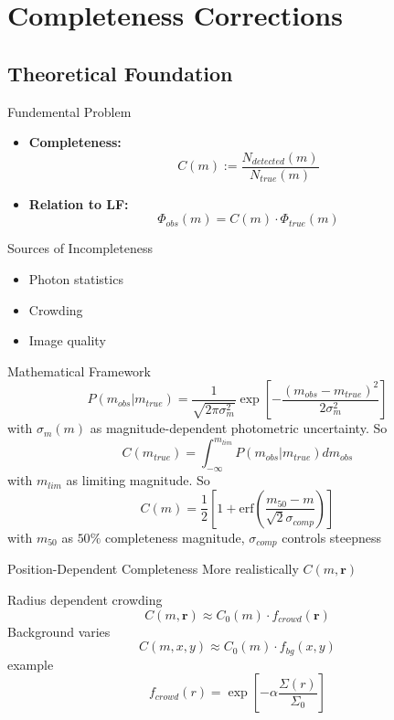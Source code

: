 \documentclass{beamer}
\begin{document}
\section{Completeness Corrections}
\subsection{Theoretical Foundation}
\begin{frame}{Fundemental Problem}
    \begin{itemize}
        \item \textbf{Completeness:}
        $$C(m) := \frac{N_{detected}(m)}{N_{true}(m)}$$
        \item \textbf{Relation to LF:}
        $$\Phi_{obs}(m) = C(m) \cdot \Phi_{true}(m)$$
    \end{itemize}
\end{frame}

\begin{frame}{Sources of Incompleteness}
    \begin{itemize}
        \item Photon statistics
        \item Crowding
        \item Image quality
    \end{itemize}
\end{frame}

\begin{frame}{Mathematical Framework}
    \[
        P(m_{obs} | m_{true}) = \frac{1}{\sqrt{2\pi \sigma_m^2}} \exp\left[ -\frac{(m_{obs}-m_{true})^2}{2\sigma_m^2}\right]
    \]
    with $\sigma_m(m)$ as magnitude-dependent photometric uncertainty. So
    \[
        C(m_{true}) = \int_{-\infty}^{m_{lim}}P(m_{obs}|m_{true})dm_{obs}
    \]
    with $m_{lim}$ as limiting magnitude. So
    \[
        C(m) = \frac{1}{2} \left[ 1 + \mathrm{erf}\left( \frac{m_{50} - m}{\sqrt{2} \sigma_{comp}}\right)\right]
    \]
    with $m_{50}$ as $50\%$ completeness magnitude, $\sigma_{comp}$ controls steepness
\end{frame}

\begin{frame}{Position-Dependent Completeness}
    More realistically $C(m,\mathbf{r})$

    Radius dependent crowding
    $$C(m,\mathbf{r}) \approx C_0(m)\cdot f_{crowd}(\mathbf{r})$$
    Background varies
    $$C(m,x,y) \approx C_0(m) \cdot f_{bg}(x,y)$$
    example
    $$f_{crowd}(r) = \exp \left[ -\alpha \frac{\Sigma(r)}{\Sigma_0} \right]$$
\end{frame}
\end{document}
